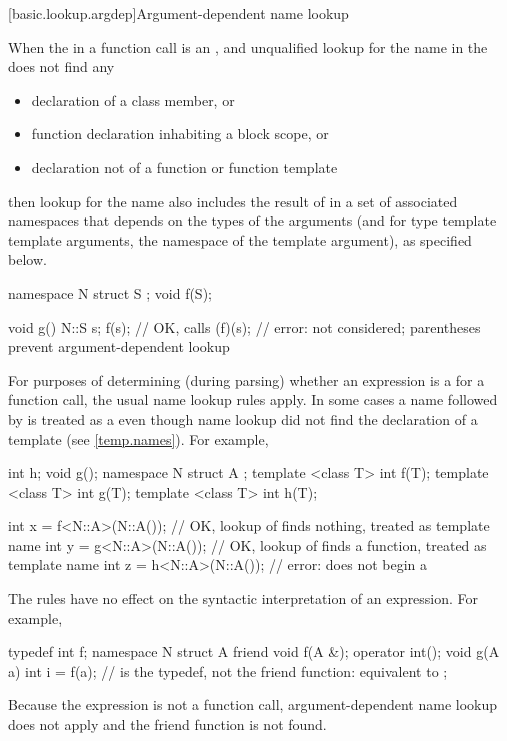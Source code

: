 [basic.lookup.argdep]{Argument-dependent name lookup}%

\pnum
When the  in
a function call is an ,
and unqualified lookup
for the name in the  does not find any
\begin{itemize}
\item
declaration of a class member, or
\item
function declaration inhabiting a block scope, or
\item
declaration not of a function or function template
\end{itemize}
then lookup for the name also includes the result of
 in a set of associated namespaces
that depends on the types of the arguments
(and for type template template arguments, the namespace of the template argument),
as specified below.
\begin{example}
\begin{codeblock}
namespace N {
  struct S { };
  void f(S);
}

void g() {
  N::S s;
  f(s);             // OK, calls 
  (f)(s);           // error:  not considered; parentheses prevent argument-dependent lookup
}
\end{codeblock}
\end{example}

\pnum
\begin{note}
For purposes of determining
(during parsing) whether an expression is a
 for a function call, the usual name lookup
rules apply.
In some cases
a name followed by \tcode{<} is treated as a 
even though name lookup did not find the declaration of a template
(see \ref{temp.names}).
For example,
\begin{codeblock}
int h;
void g();
namespace N {
  struct A {};
  template <class T> int f(T);
  template <class T> int g(T);
  template <class T> int h(T);
}

int x = f<N::A>(N::A());        // OK, lookup of  finds nothing,  treated as template name
int y = g<N::A>(N::A());        // OK, lookup of  finds a function,  treated as template name
int z = h<N::A>(N::A());        // error:  does not begin a 
\end{codeblock}

The rules have no effect on the syntactic interpretation of an expression.
For example,
\begin{codeblock}
typedef int f;
namespace N {
  struct A {
    friend void f(A &);
    operator int();
    void g(A a) {
      int i = f(a);             //  is the typedef, not the friend function: equivalent to 
    }
  };
}
\end{codeblock}
Because the expression is not a function call,
argument-dependent name lookup does not apply and
the friend function  is not found.
\end{note}

